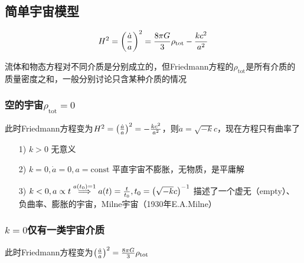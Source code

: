 \subsection{简单宇宙模型}
\begin{equation}
	H^2 = \qty(\frac{\dot{a}}{a})^2 = \frac{8 \pi G}{3} \rho_{\text{tot}} - \frac{k c^2}{a^2}
\end{equation}
\begin{cnote}
	流体和物态方程对不同介质是分别成立的，但Friedmann方程的$\rho_{\text{tot}}$是所有介质的质量密度之和，一般分别讨论只含某种介质的情况
\end{cnote}

\subsubsection{空的宇宙$\rho_{\text{tot}}=0$}
\par 
此时Friedmann方程变为$H^2 = \qty(\frac{\dot{a}}{a})^2 = - \frac{k c^2}{a^2}$，则$\dot{a} = \sqrt{-k} c$，现在方程只有曲率了
\begin{itemize}
	\item[1)] $k > 0$ 无意义
	\item[2)] $k = 0, \dot{a} = 0, a = \text{const}$ 平直宇宙不膨胀，无物质，是平庸解
	\item[3)] $k < 0, a \propto t \stackrel{a(t_0)=1}{\Longrightarrow} a(t) = \frac{t}{t_0}, t_0 = \qty(\sqrt{-k} c)^{-1}$ 描述了一个虚无（empty）、负曲率、膨胀的宇宙，Milne宇宙（1930年E.A.Milne）
\end{itemize}

\subsubsection{$k=0$仅有一类宇宙介质}
\par 
此时Friedmann方程变为$\qty(\frac{\dot{a}}{a})^2 = \frac{8 \pi G}{3} \rho_{\text{tot}}$

